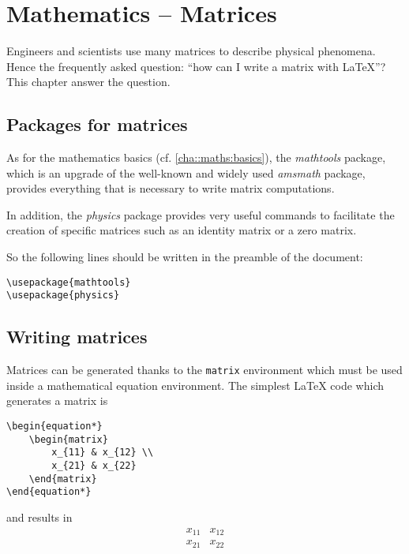 

\chapter{Mathematics -- Matrices}

	\label{cha::maths:matrix}
	

Engineers and scientists use many matrices to describe physical phenomena.
Hence the frequently asked question: \enquote{how can I write a matrix with \LaTeX{}}?
This chapter answer the question.



\section{Packages for matrices}


	As for the mathematics basics (cf. \cref{cha::maths:basics}), the \emph{mathtools} package, which is an upgrade of the well-known and widely used \emph{amsmath} package, provides everything that is necessary to write matrix computations.
	
	In addition, the \emph{physics} package provides very useful commands to facilitate the creation of specific matrices such as an identity matrix or a zero matrix.
	
	So the following lines should be written in the preamble of the document:
\begin{lstlisting}[language={[LaTeX]TeX}]
\usepackage{mathtools}
\usepackage{physics}
\end{lstlisting}



\section{Writing matrices}


	Matrices can be generated thanks to the \texttt{matrix} environment which must be used inside a mathematical equation environment.
	The simplest \LaTeX{} code which generates a matrix is
\begin{lstlisting}[language={[LaTeX]TeX}]
\begin{equation*}
	\begin{matrix}
		x_{11} & x_{12} \\
		x_{21} & x_{22}
	\end{matrix} 
\end{equation*}
\end{lstlisting}
	and results in
	\begin{equation*}
		\begin{matrix}
			x_{11} & x_{12} \\
			x_{21} & x_{22}
		\end{matrix}
	\end{equation*}
	
